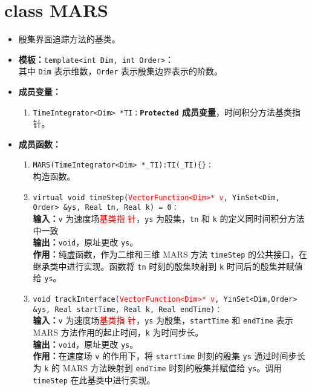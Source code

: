 \documentclass[a4paper,twoside]{ctexart}
\begin{document}
\section{class MARS}
\begin{itemize}
    \item 殷集界面追踪方法的基类。
    \item \textbf{模板：}\texttt{template<int Dim, int Order>}：\\
    其中 \texttt{Dim} 表示维数，\texttt{Order} 表示殷集边界表示的阶数。
    \item \textbf{成员变量：}
        \begin{enumerate}[(1)]
            \item \texttt{TimeIntegrator<Dim> *TI：}\textbf{\texttt{Protected}  成员变量}，时间积分方法基类指针。
        \end{enumerate}
    \item \textbf{成员函数：}
        \begin{enumerate}[(1)]
            \item \texttt{MARS(TimeIntegrator<Dim> *\_TI):TI(\_TI)\{\}：}\\构造函数。
            \item \texttt{virtual void timeStep(}\textcolor{red}{\texttt{VectorFunction<Dim>* v}}\texttt{, YinSet<Dim, Order> \&ys, Real tn, Real k) = 0：}\\
            \textbf{输入：}\texttt{v} 为速度场\textcolor{red}{基类指
                  针}，\texttt{ys} 为殷集，\texttt{tn} 和 \texttt{k} 的定义同时间积分方法中一致\\
            \textbf{输出：}\texttt{void}，原址更改 \texttt{ys}。\\
            \textbf{作用：}纯虚函数，作为二维和三维 MARS 方法 \texttt{timeStep} 的公共接口，在继承类中进行实现。函数将 \texttt{tn} 时刻的殷集映射到 \texttt{k} 时间后的殷集并赋值给 \texttt{ys}。
            \item \texttt{void trackInterface(}\textcolor{red}{\texttt{VectorFunction<Dim>* v}}\texttt{, YinSet<Dim,Order> \&ys, Real startTime, Real k, Real endTime)：}\\
            \textbf{输入：}\texttt{v} 为速度场\textcolor{red}{基类指
                  针}，\texttt{ys} 为殷集，\texttt{startTime} 和 \texttt{endTime} 表示 MARS 方法作用的起止时间，\texttt{k} 为时间步长。\\
            \textbf{输出：}\texttt{void}，原址更改 \texttt{ys}。\\
            \textbf{作用：}在速度场 \texttt{v} 的作用下，将 \texttt{startTime} 时刻的殷集 \texttt{ys} 通过时间步长为 \texttt{k} 的 MARS 方法映射到 \texttt{endTime} 时刻的殷集并赋值给 \texttt{ys}。调用 \texttt{timeStep} 在此基类中进行实现。
        \end{enumerate}
\end{itemize}
\end{document}
